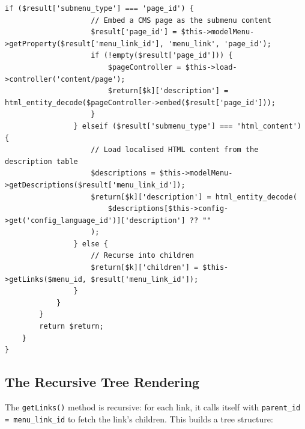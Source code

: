 \documentclass[11pt,a4paper]{article}
\begin{document}
\begin{lstlisting}[caption={\texttt{ControllerModuleLinks} --- the links widget (abridged).},label={lst:links-widget}]
                if ($result['submenu_type'] === 'page_id') {
                    // Embed a CMS page as the submenu content
                    $result['page_id'] = $this->modelMenu->getProperty($result['menu_link_id'], 'menu_link', 'page_id');
                    if (!empty($result['page_id'])) {
                        $pageController = $this->load->controller('content/page');
                        $return[$k]['description'] = html_entity_decode($pageController->embed($result['page_id']));
                    }
                } elseif ($result['submenu_type'] === 'html_content') {
                    // Load localised HTML content from the description table
                    $descriptions = $this->modelMenu->getDescriptions($result['menu_link_id']);
                    $return[$k]['description'] = html_entity_decode(
                        $descriptions[$this->config->get('config_language_id')]['description'] ?? ""
                    );
                } else {
                    // Recurse into children
                    $return[$k]['children'] = $this->getLinks($menu_id, $result['menu_link_id']);
                }
            }
        }
        return $return;
    }
}
\end{lstlisting}

\subsection{The Recursive Tree Rendering}

The \texttt{getLinks()} method is recursive: for each link, it calls
itself with \texttt{parent\_id = menu\_link\_id} to fetch the link's
children. This builds a tree structure:
\end{document}
